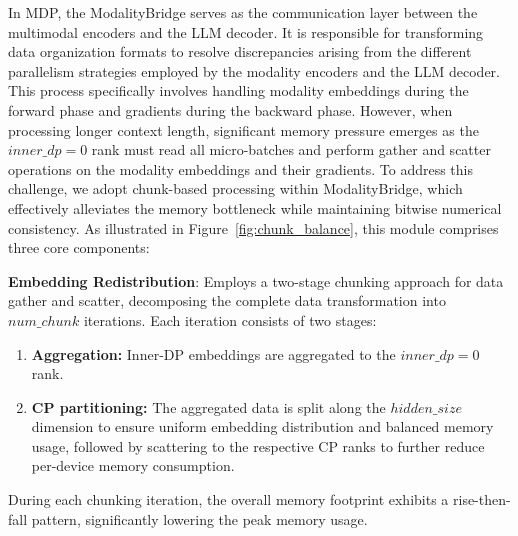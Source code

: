 \documentclass{article}
\begin{document}
In MDP, the ModalityBridge serves as the communication layer between the multimodal encoders and the LLM decoder. 
It is responsible for transforming data organization formats to resolve discrepancies arising from the different parallelism strategies employed by the modality encoders and the LLM decoder. This process specifically involves handling modality embeddings during the forward phase and gradients during the backward phase.
However, when processing longer context length, significant memory pressure emerges as the $inner\_dp=0$ rank must read all micro-batches and perform gather and scatter operations on the modality embeddings and their gradients.
To address this challenge, we adopt chunk-based processing within ModalityBridge, which effectively alleviates the memory bottleneck while maintaining bitwise numerical consistency.
As illustrated in Figure~\ref{fig:chunk_balance}, this module comprises three core components:

\textbf{Embedding Redistribution}:
Employs a two-stage chunking approach for data gather and scatter, decomposing the complete data transformation into \(num\_chunk\) iterations. Each iteration consists of two stages:  
\begin{enumerate}
    \item \textbf{Aggregation:} Inner-DP embeddings are aggregated to the \(inner\_dp = 0\) rank.
    \item \textbf{CP partitioning:} The aggregated data is split along the \(hidden\_size\) dimension to ensure uniform embedding distribution and balanced memory usage, followed by scattering to the respective CP ranks to further reduce per-device memory consumption.
\end{enumerate}

During each chunking iteration, the overall memory footprint exhibits a rise-then-fall pattern, significantly lowering the peak memory usage.
\end{document}
